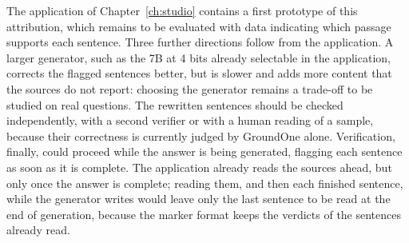 The application of Chapter~\ref{ch:studio} contains a first prototype of this attribution, which remains to be evaluated
with data indicating which passage supports each sentence. Three further directions follow from the application. A larger generator, such as the 7B at 4 bits already selectable in the application, corrects the flagged sentences better, but is slower and adds more content that the sources do not report: choosing the generator remains a trade-off to be studied on real questions. The rewritten sentences should be checked independently, with a second verifier
or with a human reading of a sample, because their correctness is currently judged by GroundOne alone. Verification,
finally, could proceed while the answer is being generated, flagging each sentence as soon as it is complete. The application already reads the sources ahead, but only once the answer is complete; reading them, and then each finished sentence, while the generator writes would leave only the last sentence to be read at the end of generation, because the marker format keeps the verdicts of the sentences already read.
